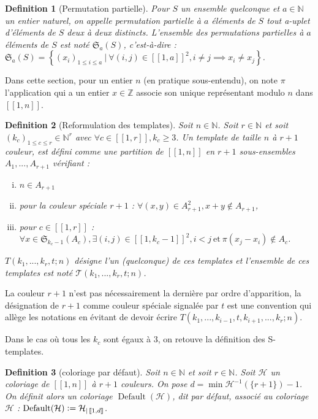 \documentclass{article}
\newtheorem{definition}{Definition}[section]
\DeclareMathOperator{\findef}{Default}
\newcommand{\defeq}{\vcentcolon=}
\begin{document}
\begin{definition}[Permutation partielle]
Pour \(S\) un ensemble quelconque et \(a \in \mathbb{N}\) un entier naturel, on appelle permutation partielle à \(a\) éléments de \(S\) tout a-uplet d'éléments de \(S\) deux à deux distincts. L'ensemble des permutations partielles à \(a\) éléments de \(S\) est noté \(\mathfrak{S}_a(S)\), c'est-à-dire : \(\mathfrak{S}_a(S) = \left\{ (x_i)_{1 \leqslant i \leqslant a} ~|~ \forall (i, j) \in [\![1, a]\!]^2, i \neq j \implies x_i \neq x_j \right\}\).
\end{definition}

Dans cette section, pour un entier \(n\) (en pratique sous-entendu), on note \(\pi\) l'application qui a un entier \(x \in \mathbb{Z}\) associe son unique représentant modulo \(n\) dans \([\![1, n]\!]\).

\begin{definition}[Reformulation des templates]
Soit \(n \in \mathbb{N}\). Soit \(r \in \mathbb{N}\) et soit \((k_c)_{1 \leqslant c \leqslant r} \in \mathbb{N}^r\) avec \(\forall c \in [\![1,r]\!], k_c \geqslant 3\). Un template de taille \(n\) à \(r + 1\) couleur, est défini comme une partition de \([\![1, n]\!]\) en \(r+1\) sous-ensembles \(A_1, ..., A_{r+1}\) vérifiant : 
\begin{enumerate}[(i)]
\item \(n \in A_{r+1}\)
\item pour la couleur spéciale \(r + 1\) : \(\forall (x,y) \in A_{r+1}^2, x + y \notin A_{r+1}\),
\item pour \(c \in [\![1, r]\!]\) : \(\forall x \in \mathfrak{S}_{k_c - 1}(A_c), \exists (i, j) \in {[\![1, k_c - 1]\!]}^2, i < j ~\text{et}~ \pi(x_j - x_i) \notin A_c\).
\end{enumerate}
 \(T(k_1, ..., k_r, t; n)\) désigne l'un (quelconque) de ces templates et l'ensemble de ces templates est noté \(\mathcal{T}(k_1, ..., k_r, t; n)\).
\end{definition}

La couleur \(r + 1\)  n'est pas nécessairement la dernière par ordre d'apparition, la désignation de \(r+1\) comme couleur spéciale signalée par \(t\) est une convention qui allège les notations en évitant de devoir écrire \(T(k_1, ..., k_{i - 1}, t,  k_{i + 1}, ..., k_r; n)\).

Dans le cas où tous les \(k_c\) sont égaux à 3, on retouve la définition des S-templates.

\begin{definition}[coloriage par défaut]
Soit \(n \in \mathbb{N}\) et soit \(r \in \mathbb{N}\). Soit \(\mathcal{H}\) un coloriage de \([\![1, n]\!]\) à \(r +1\) couleurs. On pose \(d = \min \mathcal{H}^{-1}(\{r + 1\}) - 1\). On définit alors un coloriage \(\findef(\mathcal{H})\), dit par défaut, associé au coloriage \(\mathcal{H}\) : \(\findef(\mathcal{H}) \defeq \mathcal{H}_{|\,[\![1, d]\!]}\).
\end{definition}
\end{document}
